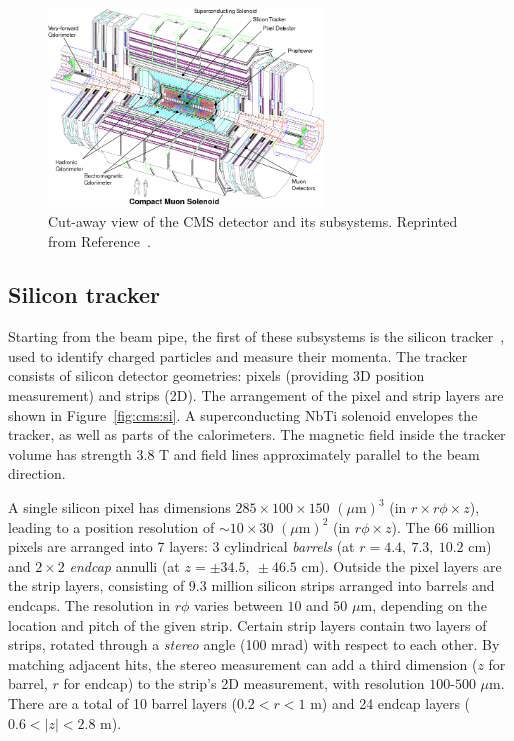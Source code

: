 \begin{figure}[]
    \begin{center}
        \includegraphics[width=0.65\textwidth]{figures/cms/cms.png}
        \caption{Cut-away view of the CMS detector and its subsystems.
                 Reprinted from Reference~\cite{cmsjinst}.}
        \label{fig:cms:cms}
    \end{center}
\end{figure}

\subsection{Silicon tracker}
\label{sec:cms:tracker}

Starting from the beam pipe, the first of these subsystems is the silicon tracker~\cite{cmstracker}, used to identify charged particles and measure their momenta. 
The tracker consists of silicon detector geometries: pixels (providing 3D position measurement) and strips (2D). 
The arrangement of the pixel and strip layers are shown in Figure~\ref{fig:cms:si}.
A superconducting NbTi solenoid envelopes the tracker, as well as parts of the calorimeters. 
The magnetic field inside the tracker volume has strength 3.8 T and field lines approximately parallel to the beam direction. 

A single silicon pixel has dimensions $285\times100\times150$ $(\mu\mathrm{m})^3$ (in $r\times r\phi\times z$), leading to a position resolution of $\sim10\times30$ $(\mu\mathrm{m})^2$ (in $r\phi\times z$). 
The 66 million pixels are arranged into 7 layers: 3 cylindrical \emph{barrels} (at $r=4.4,~7.3,~10.2$ cm) and $2\times2$ \emph{endcap} annulli (at $z=\pm34.5,~\pm46.5$ cm). 
Outside the pixel layers are the strip layers, consisting of 9.3 million silicon strips arranged into barrels and endcaps.
The resolution in $r\phi$ varies between $10$ and $50$ $\mu$m, depending on the location and pitch of the given strip.
Certain strip layers contain two layers of strips, rotated through a \emph{stereo} angle (100 mrad) with respect to each other.
By matching adjacent hits, the stereo measurement can add a third dimension ($z$ for barrel, $r$ for endcap) to the strip's 2D measurement, with resolution $100$-$500$ $\mu$m.
There are a total of 10 barrel layers ($0.2 < r < 1$ m) and 24 endcap layers ($0.6 < |z| < 2.8$ m). 

